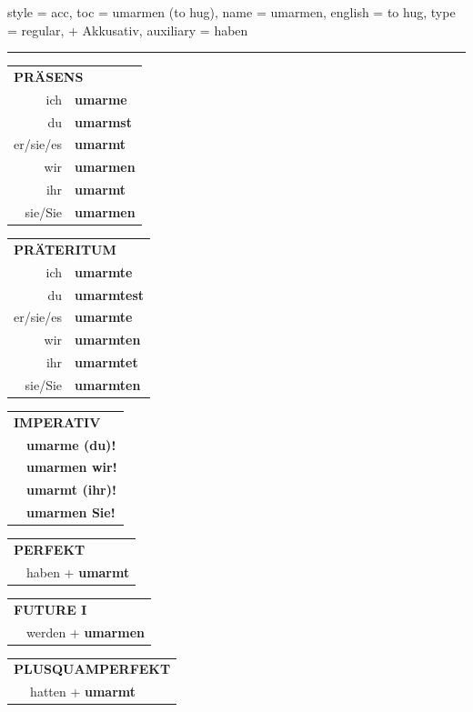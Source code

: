 \begin{verbentry}{
  style = {acc},
  toc = {umarmen (to hug)},
  name = {umarmen},
  english = {to hug},
  type = {regular, + Akkusativ},
  auxiliary = {haben}
}


\vspace{5pt}
\hrule
\vspace{5pt}

\begin{tabular}{rl}
\multicolumn{2}{l}{\textbf{PRÄSENS}}\\
ich & \textbf{umarme}\\
du & \textbf{umarmst}\\
er/sie/es & \textbf{umarmt}\\
wir & \textbf{umarmen}\\
ihr & \textbf{umarmt}\\
sie/Sie & \textbf{umarmen}\\
\end{tabular}
\hfill
\begin{tabular}{rl}
\multicolumn{2}{l}{\textbf{PRÄTERITUM}}\\
ich & \textbf{umarmte}\\
du & \textbf{umarmtest}\\
er/sie/es & \textbf{umarmte}\\
wir & \textbf{umarmten}\\
ihr & \textbf{umarmtet}\\
sie/Sie & \textbf{umarmten}\\
\end{tabular}
\hfill
\begin{tabular}{rl}
\multicolumn{2}{l}{\textbf{IMPERATIV}}\\
& \textbf{umarme (du)!}\\
& \textbf{umarmen wir!}\\
& \textbf{umarmt (ihr)!}\\
& \textbf{umarmen Sie!}\\
\end{tabular}

\vspace{10pt}

\begin{tabular}{rl}
\multicolumn{2}{l}{\textbf{PERFEKT}}\\
& haben + \textbf{umarmt}\\
\end{tabular}
\hfill
\begin{tabular}{rl}
\multicolumn{2}{l}{\textbf{FUTURE I}}\\
& werden + \textbf{umarmen}\\
\end{tabular}
\hfill
\begin{tabular}{rl}
\multicolumn{2}{l}{\textbf{PLUSQUAMPERFEKT}}\\
& hatten + \textbf{umarmt}\\
\end{tabular}


\end{verbentry}
